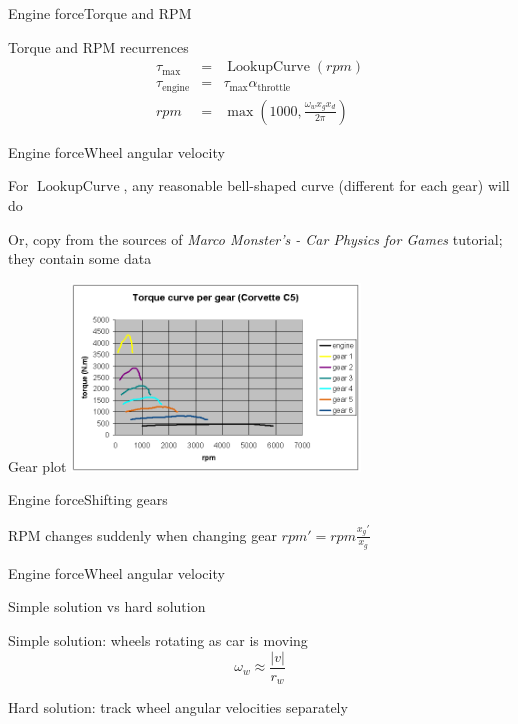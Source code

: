 \documentclass{beamer}
\DeclareMathOperator{\LookupCurve}{LookupCurve}
\begin{document}
\begin{slide}{Engine force}{Torque and RPM}{
\item Torque and RPM recurrences
\begin{eqnarray}
\tau_{\text{max}} &=& \LookupCurve(rpm) \\
\tau_{\text{engine}} &=& \tau_{\text{max}} \alpha_{\text{throttle}} \\
rpm &=& \max(1000, \frac{\omega_w x_g x_d}{2 \pi})
\end{eqnarray}
}\end{slide}

\begin{slide}{Engine force}{Wheel angular velocity}{
\item For $\LookupCurve$, any reasonable bell-shaped curve (different for each gear) will do
\item Or, copy from the sources of \textit{Marco Monster's - Car Physics for Games} tutorial; they contain some data
}\end{slide}

\begin{frame}{Gear plot}
\center
\includegraphics[height=5cm]{Pics/GearPlot.png}
\end{frame}

\begin{slide}{Engine force}{Shifting gears}{
\item RPM changes suddenly when changing gear $rpm' = rpm \frac{x_g'}{x_g}$
}\end{slide}

\begin{slide}{Engine force}{Wheel angular velocity}{
\item Simple solution vs hard solution
\item Simple solution: wheels rotating as car is moving
$$\omega_w \approx \frac{|v|}{r_w}$$
\item Hard solution: track wheel angular velocities separately
}\end{slide}
\end{document}
